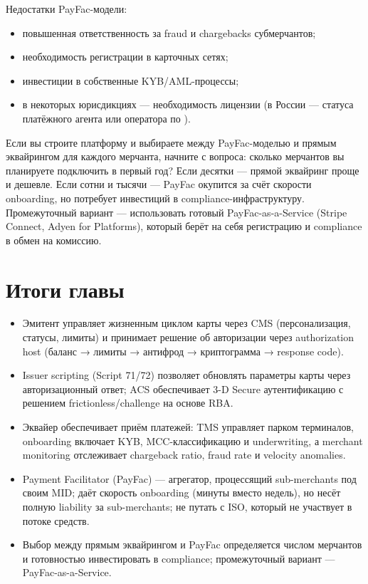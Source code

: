 Недостатки PayFac-модели:
\begin{itemize}
  \item повышенная ответственность за fraud и chargebacks субмерчантов;
  \item необходимость регистрации в карточных сетях;
  \item инвестиции в собственные KYB/AML-процессы;
  \item в некоторых юрисдикциях — необходимость лицензии
        (в России — статуса платёжного агента или оператора
        по ).
\end{itemize}

\begin{kaobox}[title=На практике]
  Если вы строите платформу и выбираете между PayFac-моделью
  и прямым эквайрингом для каждого мерчанта, начните
  с вопроса: сколько мерчантов вы планируете подключить
  в первый год? Если десятки — прямой эквайринг проще
  и дешевле. Если сотни и тысячи — PayFac окупится
  за счёт скорости onboarding, но потребует инвестиций
  в compliance-инфраструктуру. Промежуточный вариант —
  использовать готовый PayFac-as-a-Service (Stripe Connect,
  Adyen for Platforms), который берёт на себя регистрацию
  и compliance в обмен на комиссию.
\end{kaobox}

\section*{Итоги главы}

\begin{itemize}
  \item Эмитент управляет жизненным циклом карты через CMS
        (персонализация, статусы, лимиты) и принимает решение
        об авторизации через authorization host (баланс → лимиты
        → антифрод → криптограмма → response code).
  \item Issuer scripting (Script 71/72) позволяет обновлять параметры карты через авторизационный ответ; ACS обеспечивает 3-D
        Secure аутентификацию с решением frictionless/challenge на основе RBA.
  \item Эквайер обеспечивает приём платежей: TMS управляет
        парком терминалов, onboarding включает KYB,
        MCC-классификацию и underwriting, а merchant monitoring
        отслеживает chargeback ratio, fraud rate и velocity
        anomalies.
  \item Payment Facilitator (PayFac) — агрегатор, процессящий sub-merchants под своим MID; даёт скорость onboarding (минуты
        вместо недель), но несёт полную liability за sub-merchants; не путать с ISO, который не участвует в потоке средств.
  \item Выбор между прямым эквайрингом и PayFac определяется
        числом мерчантов и готовностью инвестировать
        в compliance; промежуточный вариант — PayFac-as-a-Service.
\end{itemize}
